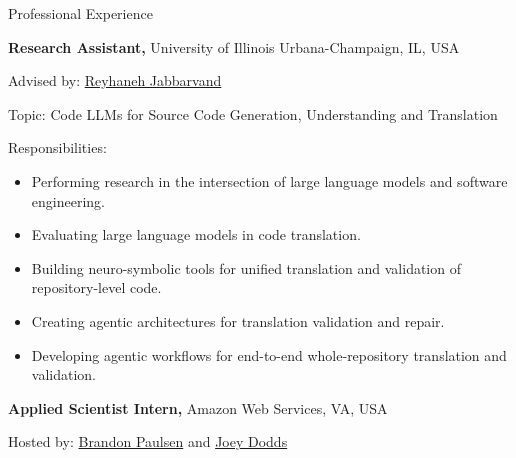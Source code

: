 \begin{rubric}{Professional Experience}



\entry*[08/22 -- 08/26]%
	\textbf{Research Assistant,} University of Illinois Urbana-Champaign, IL, USA
        
        \par Advised by: \href{https://reyhaneh.cs.illinois.edu/}{Reyhaneh Jabbarvand}
        
        \par Topic: Code LLMs for Source Code Generation, Understanding and Translation

        \par Responsibilities:

        \begin{itemize}[leftmargin=*, noitemsep, topsep=0pt]

            \item Performing research in the intersection of large language models and software engineering.

            \item Evaluating large language models in code translation.

            \item Building neuro-symbolic tools for unified translation and validation of repository-level code.

            \item Creating agentic architectures for translation validation and repair.

            \item Developing agentic workflows for end-to-end whole-repository translation and validation.
        \end{itemize}
        
\entry*[05/25 -- 08/25]%
	\textbf{Applied Scientist Intern,} Amazon Web Services, VA, USA
        
        \par Hosted by: \href{https://www.amazon.science/author/brandon-paulsen}{Brandon Paulsen} and \href{https://www.amazon.science/author/joey-dodds}{Joey Dodds}
        

\end{rubric}
